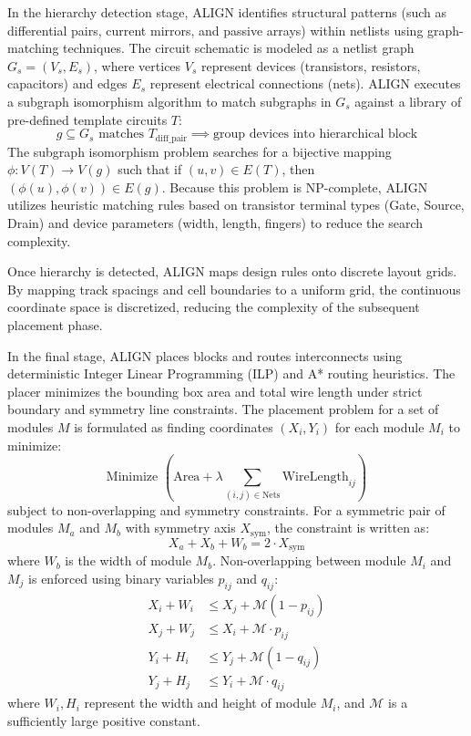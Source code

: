 In the hierarchy detection stage, ALIGN identifies structural patterns (such as differential pairs, current mirrors, and passive arrays) within netlists using graph-matching techniques. The circuit schematic is modeled as a netlist graph $G_s = (V_s, E_s)$, where vertices $V_s$ represent devices (transistors, resistors, capacitors) and edges $E_s$ represent electrical connections (nets). ALIGN executes a subgraph isomorphism algorithm to match subgraphs in $G_s$ against a library of pre-defined template circuits $T$:
\begin{equation}
    g \subseteq G_s \text{ matches } T_{\text{diff\_pair}} \implies \text{group devices into hierarchical block}
\end{equation}
The subgraph isomorphism problem searches for a bijective mapping $\phi: V(T) \to V(g)$ such that if $(u, v) \in E(T)$, then $(\phi(u), \phi(v)) \in E(g)$. Because this problem is NP-complete, ALIGN utilizes heuristic matching rules based on transistor terminal types (Gate, Source, Drain) and device parameters (width, length, fingers) to reduce the search complexity.

Once hierarchy is detected, ALIGN maps design rules onto discrete layout grids. By mapping track spacings and cell boundaries to a uniform grid, the continuous coordinate space is discretized, reducing the complexity of the subsequent placement phase.

In the final stage, ALIGN places blocks and routes interconnects using deterministic Integer Linear Programming (ILP) and A* routing heuristics. The placer minimizes the bounding box area and total wire length under strict boundary and symmetry line constraints. The placement problem for a set of modules $M$ is formulated as finding coordinates $(X_i, Y_i)$ for each module $M_i$ to minimize:
\begin{equation}
    \text{Minimize } \left( \text{Area} + \lambda \sum_{(i,j) \in \text{Nets}} \text{WireLength}_{ij} \right)
\end{equation}
subject to non-overlapping and symmetry constraints. For a symmetric pair of modules $M_a$ and $M_b$ with symmetry axis $X_{\text{sym}}$, the constraint is written as:
\begin{equation}
    X_a + X_b + W_b = 2 \cdot X_{\text{sym}}
\end{equation}
where $W_b$ is the width of module $M_b$. Non-overlapping between module $M_i$ and $M_j$ is enforced using binary variables $p_{ij}$ and $q_{ij}$:
\begin{align}
    X_i + W_i &\le X_j + \mathcal{M}(1 - p_{ij}) \\
    X_j + W_j &\le X_i + \mathcal{M} \cdot p_{ij} \\
    Y_i + H_i &\le Y_j + \mathcal{M}(1 - q_{ij}) \\
    Y_j + H_j &\le Y_i + \mathcal{M} \cdot q_{ij}
\end{align}
where $W_i, H_i$ represent the width and height of module $M_i$, and $\mathcal{M}$ is a sufficiently large positive constant.

